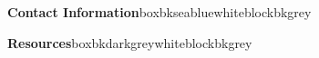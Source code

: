 \documentclass{beamer}
\begin{document}
\begin{frame}[t]
\begin{columns}[T]
\begin{column}{.46\textwidth}
%					
%			
				\begin{customblock}{\textbf{Contact Information}}{boxbkseablue}{white}{blockbkgrey}
					
				\end{customblock}
				
				\begin{customblock}{\textbf{Resources}}{boxbkdarkgrey}{white}{blockbkgrey}
					
				\end{customblock}
			
			\end{column}
			
		\end{columns}

	\end{frame}
\end{document}
